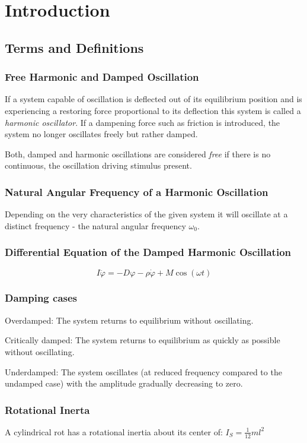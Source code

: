 \chapter{Introduction}
%
\section{Terms and Definitions}
    \subsection*{Free Harmonic and Damped Oscillation}
        If a system capable of oscillation is deflected out of its equilibrium position and is experiencing a restoring force
        proportional to its deflection this system is called a \textit{harmonic oscillator}. If a dampening force such as friction
        is introduced, the system no longer oscillates freely but rather damped.\par
        Both, damped and harmonic oscillations are considered \textit{free} if there is no continuous, the oscillation driving
        stimulus present.
    \subsection*{Natural Angular Frequency of a Harmonic Oscillation}
        Depending on the very characteristics of the given system it will oscillate at a distinct frequency - the natural angular
        frequency \( \omega_0 \).
    \subsection*{Differential Equation of the Damped Harmonic Oscillation}
        \begin{equation}
            I \ddot{\varphi} = -D\varphi -\rho\dot{\varphi}+M\cos(\omega t)
        \end{equation}
    \subsection*{Damping cases}
        Overdamped: The system returns to equilibrium without oscillating.\par
        Critically damped: The system returns to equilibrium as quickly as possible without oscillating.\par
        Underdamped: The system oscillates (at reduced frequency compared to the undamped case) with the amplitude gradually
        decreasing to zero.
    \subsection*{Rotational Inerta}
        A cylindrical rot has a rotational inertia about its center of: \(I_S = \frac{1}{12}ml^2\)
